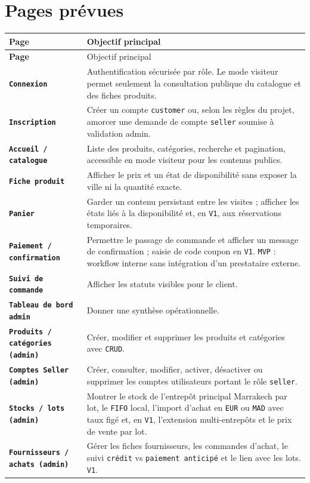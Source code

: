 \documentclass[11pt,a4paper]{scrreprt}
\newcommand{\code}[1]{\texttt{#1}}
\begin{document}
\section{Pages prévues}
\begin{longtable}{>{\bfseries}p{4.1cm}p{10.1cm}}
\toprule
Page & Objectif principal \\
\midrule
\endfirsthead
\toprule
Page & Objectif principal \\
\midrule
\endhead
\code{Connexion} & Authentification sécurisée par rôle. Le mode visiteur permet seulement la consultation publique du catalogue et des fiches produits. \\
\code{Inscription} & Créer un compte \code{customer} ou, selon les règles du projet, amorcer une demande de compte \code{seller} soumise à validation admin. \\
\code{Accueil / catalogue} & Liste des produits, catégories, recherche et pagination, accessible en mode visiteur pour les contenus publics. \\
\code{Fiche produit} & Afficher le prix et un état de disponibilité sans exposer la ville ni la quantité exacte. \\
\code{Panier} & Garder un contenu persistant entre les visites ; afficher les états liés à la disponibilité et, en \code{V1}, aux réservations temporaires. \\
\code{Paiement / confirmation} & Permettre le passage de commande et afficher un message de confirmation ; saisie de code coupon en \code{V1}. \code{MVP} : workflow interne sans intégration d'un prestataire externe. \\
\code{Suivi de commande} & Afficher les statuts visibles pour le client. \\
\code{Tableau de bord admin} & Donner une synthèse opérationnelle. \\
\code{Produits / catégories (admin)} & Créer, modifier et supprimer les produits et catégories avec \code{CRUD}. \\
\code{Comptes Seller (admin)} & Créer, consulter, modifier, activer, désactiver ou supprimer les comptes utilisateurs portant le rôle \code{seller}. \\
\code{Stocks / lots (admin)} & Montrer le stock de l'entrepôt principal Marrakech par lot, le \code{FIFO} local, l'import d'achat en \code{EUR} ou \code{MAD} avec taux figé et, en \code{V1}, l'extension multi-entrepôts et le prix de vente par lot. \\
\code{Fournisseurs / achats (admin)} & Gérer les fiches fournisseurs, les commandes d'achat, le suivi \code{crédit} vs \code{paiement anticipé} et le lien avec les lots. \code{V1}. \\

\end{longtable}
\end{document}
